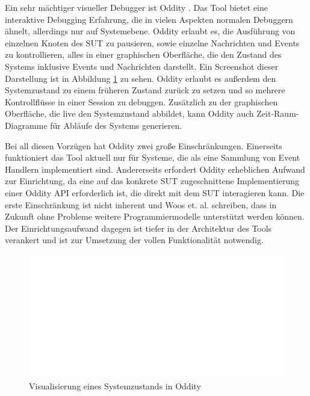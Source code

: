 \documentclass[12pt,a4paper]{report}
\begin{document}
Ein sehr mächtiger visueller Debugger ist Oddity \cite{oddity_graphical_debugger}. Das Tool bietet eine interaktive Debugging
Erfahrung, die in vielen Aspekten normalen Debuggern ähnelt, allerdings nur auf Systemebene. Oddity erlaubt es, die Ausführung von
einzelnen Knoten des SUT zu pausieren, sowie einzelne Nachrichten und Events zu kontrollieren, alles in einer graphischen
Oberfläche, die den Zustand des Systems inklusive Events und Nachrichten darstellt. Ein Screenshot dieser Darstellung ist in
Abbildung \ref{fig:oddity} zu sehen. Oddity erlaubt es außerdem den Systemzustand zu einem früheren Zustand zurück zu setzen und
so mehrere Kontrollflüsse in einer Session zu debuggen. Zusätzlich zu der graphischen Oberfläche, die live den Systemzustand
abbildet, kann Oddity auch Zeit-Raum-Diagramme für Abläufe des Systems generieren.

Bei all diesen Vorzügen hat Oddity zwei große Einschränkungen. Einerseits funktioniert das Tool aktuell nur für Systeme, die als
eine Sammlung von Event Handlern implementiert sind. Andererseits erfordert Oddity erheblichen Aufwand zur Einrichtung, da eine
auf das konkrete SUT zugeschnittene Implementierung einer Oddity API erforderlich ist, die direkt mit dem SUT interagieren kann.
Die erste Einschränkung ist nicht inherent und Woos et. al. \cite{oddity_graphical_debugger} schreiben, dass in Zukunft ohne Probleme weitere
Programmiermodelle unterstützt werden können. Der Einrichtungsaufwand dagegen ist tiefer in der Architektur des Tools verankert und
ist zur Umsetzung der vollen Funktionalität notwendig.

\begin{figure}[H]
	\centering
	\includegraphics[width=\linewidth]{img/oddity_raft_state.pdf}
	\caption{Visualisierung eines Systemzustands in Oddity \cite{oddity_graphical_debugger}}
	\label{fig:oddity}
\end{figure}
\end{document}
